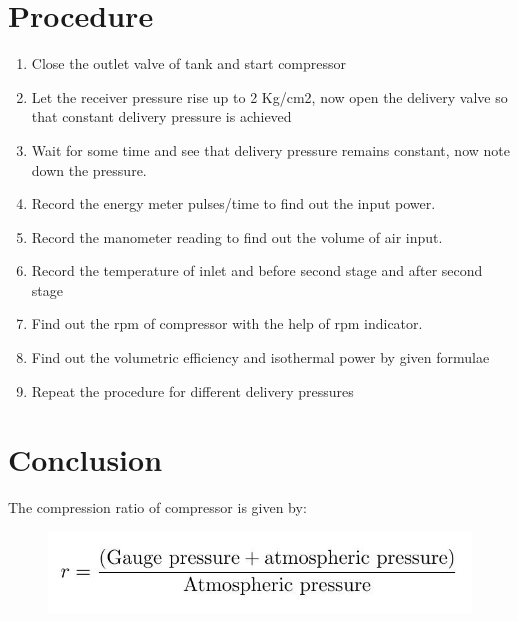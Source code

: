 \documentclass[11pt]{article}
\begin{document}
\section{Procedure}

\begin{enumerate}
	\item Close the outlet valve of tank and start compressor
	\item Let the receiver pressure rise up to 2 Kg/cm2, now open the delivery valve so that constant delivery pressure is achieved
	\item Wait for some time and see that delivery pressure remains constant, now note down the pressure.
	\item Record the energy meter pulses/time to find out the input power.
	\item Record the manometer reading to find out the volume of air input.
	\item Record the temperature of inlet and before second stage and after second stage
	\item Find out the rpm of compressor with the help of rpm indicator.
	\item Find out the volumetric efficiency and isothermal power by given formulae
	\item Repeat the procedure for different delivery pressures
	
\end{enumerate}

\section{Conclusion}

The compression ratio of compressor is given by:

\centering

\begin{figure}[H]
	\centering
	\includegraphics[scale=0.4]{equation.jpg}
\end{figure}
\end{document}
